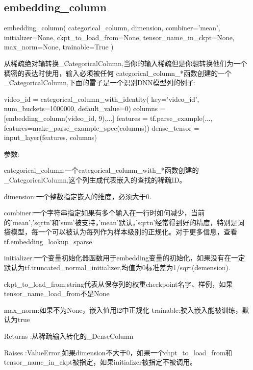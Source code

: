 \subsection{embedding\_column}
\begin{python}
embedding_column(
    categorical_column,
    dimension,
    combiner='mean',
    initializer=None,
    ckpt_to_load_from=None,
    tensor_name_in_ckpt=None,
    max_norm=None,
    trainable=True
)
\end{python}
从稀疏绝对输转换\_CategoricalColumn,当你的输入稀疏但是你想转换他们为一个稠密的表达时使用，输入必须被任何 categorical\_column\_*函数创建的一个\_CategoricalColumn,下面的雷子是一个识别DNN模型列的例子:
\begin{python}
video_id = categorical_column_with_identity(
    key='video_id', num_buckets=1000000, default_value=0)
columns = [embedding_column(video_id, 9),...]
features = tf.parse_example(..., features=make_parse_example_spec(columns))
dense_tensor = input_layer(features, columns)
\end{python}
参数:
\begin{python}
\item categorical\_column:一个categorical\_column\_with\_*函数创建的\_CategoricalColumn,这个列生成代表嵌入的查找的稀疏ID。
\item dimension:一个整数指定嵌入的维度，必须大于0.
\item combiner:一个字符串指定如果有多个输入在一行时如何减少，当前的'mean','sqrtn'和'sum'被支持，'mean'默认，'sqrtn'经常得到好的精度，特别是词袋模型，每一个可以被认为每列作为样本级别的正规化。对于更多信息，查看tf.embedding\_lookup\_sparse.
\item initializer:一个变量初始化器函数用于embedding变量的初始化，如果没有在一定默认为tf.truncated\_normal\_initializer,均值为0标准差为1/sqrt(demension).
\item ckpt\_to\_load\_from:string代表从保存列的权重checkpoint名字、样例，如果tensor\_name\_load\_from不是None
\item max\_norm:如果不为None，嵌入值用l2中正规化
\iten trainable:驶入嵌入能被训练，默认为true
\item[Returns]:从稀疏输入转化的\_DenseColumn
\item [Raises]:ValueError,如果dimension不大于0，如果一个chpt\_to\_load\_from和tensor\_name\_in\_ckpt被指定，如果initializer被指定不被调用。
\end{python}
